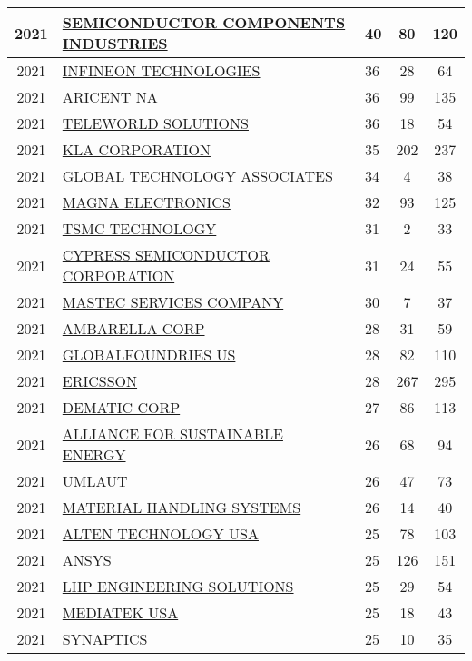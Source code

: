 \documentclass{article}%
\begin{document}
\begin{longtable}{c|p{20em}|p{5em}|c|c}
\hline%
2021&\hyperref[subsec:SEMICONDUCTORCOMPONENTSINDUSTRIES]{SEMICONDUCTOR COMPONENTS INDUSTRIES}&40&80&120\\%
\hline%
2021&\hyperref[subsec:INFINEONTECHNOLOGIES]{INFINEON TECHNOLOGIES}&36&28&64\\%
\hline%
2021&\hyperref[subsec:ARICENTNA]{ARICENT NA}&36&99&135\\%
\hline%
2021&\hyperref[subsec:TELEWORLDSOLUTIONS]{TELEWORLD SOLUTIONS}&36&18&54\\%
\hline%
2021&\hyperref[subsec:KLACORPORATION]{KLA CORPORATION}&35&202&237\\%
\hline%
2021&\hyperref[subsec:GLOBALTECHNOLOGYASSOCIATES]{GLOBAL TECHNOLOGY ASSOCIATES}&34&4&38\\%
\hline%
2021&\hyperref[subsec:MAGNAELECTRONICS]{MAGNA ELECTRONICS}&32&93&125\\%
\hline%
2021&\hyperref[subsec:TSMCTECHNOLOGY]{TSMC TECHNOLOGY}&31&2&33\\%
\hline%
2021&\hyperref[subsec:CYPRESSSEMICONDUCTORCORPORATION]{CYPRESS SEMICONDUCTOR CORPORATION}&31&24&55\\%
\hline%
2021&\hyperref[subsec:MASTECSERVICESCOMPANY]{MASTEC SERVICES COMPANY}&30&7&37\\%
\hline%
2021&\hyperref[subsec:AMBARELLACORP]{AMBARELLA CORP}&28&31&59\\%
\hline%
2021&\hyperref[subsec:GLOBALFOUNDRIESUS]{GLOBALFOUNDRIES US}&28&82&110\\%
\hline%
2021&\hyperref[subsec:ERICSSON]{ERICSSON}&28&267&295\\%
\hline%
2021&\hyperref[subsec:DEMATICCORP]{DEMATIC CORP}&27&86&113\\%
\hline%
2021&\hyperref[subsec:ALLIANCEFORSUSTAINABLEENERGY]{ALLIANCE FOR SUSTAINABLE ENERGY}&26&68&94\\%
\hline%
2021&\hyperref[subsec:UMLAUT]{UMLAUT}&26&47&73\\%
\hline%
2021&\hyperref[subsec:MATERIALHANDLINGSYSTEMS]{MATERIAL HANDLING SYSTEMS}&26&14&40\\%
\hline%
2021&\hyperref[subsec:ALTENTECHNOLOGYUSA]{ALTEN TECHNOLOGY USA}&25&78&103\\%
\hline%
2021&\hyperref[subsec:ANSYS]{ANSYS}&25&126&151\\%
\hline%
2021&\hyperref[subsec:LHPENGINEERINGSOLUTIONS]{LHP ENGINEERING SOLUTIONS}&25&29&54\\%
\hline%
2021&\hyperref[subsec:MEDIATEKUSA]{MEDIATEK USA}&25&18&43\\%
\hline%
2021&\hyperref[subsec:SYNAPTICS]{SYNAPTICS}&25&10&35\\%

\end{longtable}
\end{document}
